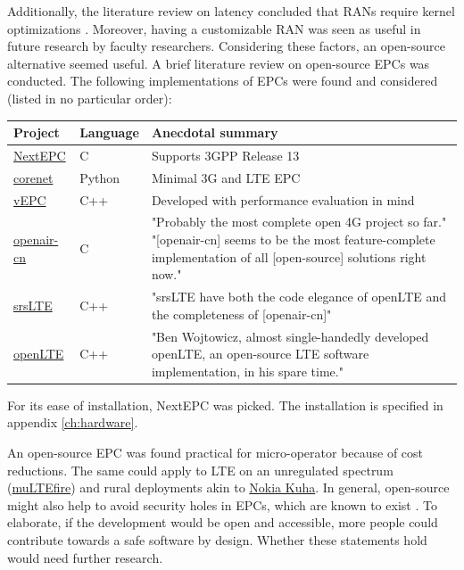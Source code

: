 \documentclass[12pt]{article}
\begin{document}
Additionally, the literature review on latency concluded that \glspl{RAN} require kernel optimizations \cite{mao2015minimizing}. Moreover, having a customizable \gls{RAN} was seen as useful in future research by faculty researchers. Considering these factors, an open-source alternative seemed useful. A brief literature review on open-source \glspl{EPC} was conducted. The following implementations of \glspl{EPC} were found and considered (listed in no particular order):
\begin{center}
    \begin{tabular}{ | l | l | p{10cm} |}
    \hline
    Project & Language & Anecdotal summary \\ \hline
    \href{https://github.com/acetcom/nextepc}{NextEPC} & C & Supports \gls{3GPP} Release 13 \\
    \hline
    \href{https://github.com/mitshell/corenet}{corenet} & Python & Minimal 3G and \gls{LTE} \gls{EPC} \\
    \hline
    \href{https://github.com/networkedsystemsIITB/NFV_LTE_EPC}{vEPC} & C++ & Developed with performance evaluation in mind \cite{jain2016comparison} \\
    \hline

    \href{https://gitlab.eurecom.fr/oai/openair-cn}{openair-cn} & C & "Probably the most complete open 4G project so far." \cite{website:spectrum-ieee} "[openair-cn] seems to be the most feature-complete implementation of all [open-source] solutions right now." \cite{website:srslte-mailinglist} \\
    \hline

    \href{https://github.com/srsLTE/srsLTE}{srsLTE} & C++ & "srsLTE have both the code elegance of openLTE and the completeness of [openair-cn]" \cite{website:cyberlog} \\
    \hline

    \href{http://openlte.sourceforge.net/}{openLTE} & C++ & "Ben Wojtowicz, almost single-handedly developed openLTE, an open-source \gls{LTE} software implementation, in his spare time." \cite{website:spectrum-ieee} \\
    \hline
    \end{tabular}
\end{center}

For its ease of installation, NextEPC was picked. The installation is specified in appendix \ref{ch:hardware}.

An open-source \gls{EPC} was found practical for micro-operator because of cost reductions. The same could apply to \gls{LTE} on an unregulated spectrum (\href{https://www.multefire.org/}{muLTEfire}) and rural deployments akin to \href{https://www.kuha.io/}{Nokia Kuha}. In general, open-source might also help to avoid security holes in \glspl{EPC}, which are known to exist \cite{shaik2015practical, rupprechtbreaking}. To elaborate, if the development would be open and accessible, more people could contribute towards a safe software by design. Whether these statements hold would need further research.
\end{document}
